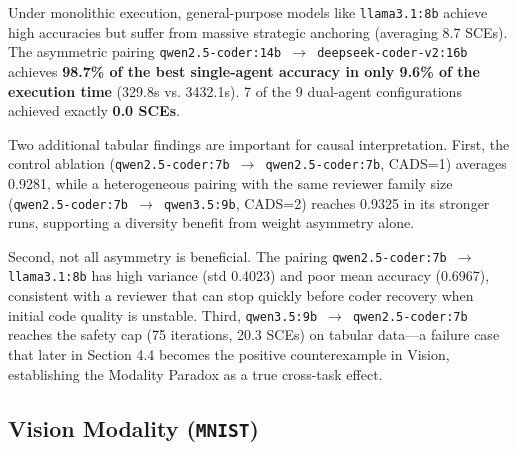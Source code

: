 \documentclass[11pt,a4paper]{article}
\begin{document}
Under monolithic execution, general-purpose models like \texttt{llama3.1:8b} achieve high accuracies but suffer from massive strategic anchoring (averaging 8.7 SCEs). The asymmetric pairing \texttt{qwen2.5-coder:14b $\rightarrow$ deepseek-coder-v2:16b} achieves \textbf{98.7\% of the best single-agent accuracy in only 9.6\% of the execution time} (329.8s vs. 3432.1s). 7 of the 9 dual-agent configurations achieved exactly \textbf{0.0 SCEs}.

Two additional tabular findings are important for causal interpretation. First, the control ablation (\texttt{qwen2.5-coder:7b $\rightarrow$ qwen2.5-coder:7b}, CADS=1) averages 0.9281, while a heterogeneous pairing with the same reviewer family size (\texttt{qwen2.5-coder:7b $\rightarrow$ qwen3.5:9b}, CADS=2) reaches 0.9325 in its stronger runs, supporting a diversity benefit from weight asymmetry alone.

Second, not all asymmetry is beneficial. The pairing \texttt{qwen2.5-coder:7b $\rightarrow$ llama3.1:8b} has high variance (std 0.4023) and poor mean accuracy (0.6967), consistent with a reviewer that can stop quickly before coder recovery when initial code quality is unstable. Third, \texttt{qwen3.5:9b $\rightarrow$ qwen2.5-coder:7b} reaches the safety cap (75 iterations, 20.3 SCEs) on tabular data---a failure case that later in Section 4.4 becomes the positive counterexample in Vision, establishing the Modality Paradox as a true cross-task effect.


\subsection{Vision Modality (\texttt{MNIST})}
\end{document}
